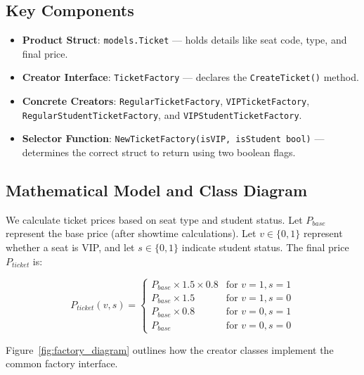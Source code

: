 \documentclass[conference]{IEEEtran}
\begin{document}
\subsection{Key Components}

\begin{itemize}
  \item \textbf{Product Struct}: \texttt{models.Ticket} --- holds details like seat code, type, and final price.
  \item \textbf{Creator Interface}: \texttt{TicketFactory} --- declares the \texttt{CreateTicket()} method.
  \item \textbf{Concrete Creators}: \texttt{RegularTicketFactory}, \texttt{VIPTicketFactory}, \texttt{RegularStudent}\-\texttt{TicketFactory}, and \texttt{VIPStudent}\-\texttt{TicketFactory}.
  \item \textbf{Selector Function}: \texttt{NewTicketFactory(isVIP, isStudent bool)} --- determines the correct struct to return using two boolean flags.
\end{itemize}

\subsection{Mathematical Model and Class Diagram}

We calculate ticket prices based on seat type and student status. Let $P_{base}$ represent the base price (after showtime calculations). Let $v \in \{0, 1\}$ represent whether a seat is VIP, and let $s \in \{0, 1\}$ indicate student status. The final price $P_{ticket}$ is:

\begin{equation}
P_{ticket}(v, s) =
\begin{cases}
P_{base} \times 1.5 \times 0.8 & \text{for } v = 1, s = 1 \\
P_{base} \times 1.5 & \text{for } v = 1, s = 0 \\
P_{base} \times 0.8 & \text{for } v = 0, s = 1 \\
P_{base} & \text{for } v = 0, s = 0
\end{cases}
\end{equation}

Figure~\ref{fig:factory_diagram} outlines how the creator classes implement the common factory interface.
\end{document}
